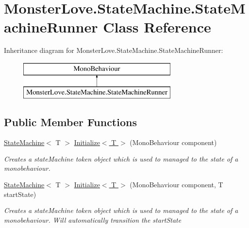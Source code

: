 \hypertarget{class_monster_love_1_1_state_machine_1_1_state_machine_runner}{}\section{Monster\+Love.\+State\+Machine.\+State\+Machine\+Runner Class Reference}
\label{class_monster_love_1_1_state_machine_1_1_state_machine_runner}
Inheritance diagram for Monster\+Love.\+State\+Machine.\+State\+Machine\+Runner\+:\begin{figure}[H]
\begin{center}
\leavevmode
\includegraphics[height=2.000000cm]{class_monster_love_1_1_state_machine_1_1_state_machine_runner}
\end{center}
\end{figure}
\subsection*{Public Member Functions}
\begin{DoxyCompactItemize}
\item 
\hyperlink{class_monster_love_1_1_state_machine_1_1_state_machine}{State\+Machine}$<$ T $>$ \hyperlink{class_monster_love_1_1_state_machine_1_1_state_machine_runner_a22c9dd00a40d14c59bd457f3e17a3f5c}{Initialize$<$ T $>$} (Mono\+Behaviour component)
\begin{DoxyCompactList}\small\item\em Creates a state\+Machine token object which is used to managed to the state of a monobehaviour. \end{DoxyCompactList}\item 
\hyperlink{class_monster_love_1_1_state_machine_1_1_state_machine}{State\+Machine}$<$ T $>$ \hyperlink{class_monster_love_1_1_state_machine_1_1_state_machine_runner_a4ce881f8915173e42b036bbcef117a6b}{Initialize$<$ T $>$} (Mono\+Behaviour component, T start\+State)
\begin{DoxyCompactList}\small\item\em Creates a state\+Machine token object which is used to managed to the state of a monobehaviour. Will automatically transition the start\+State \end{DoxyCompactList}\end{DoxyCompactItemize}
